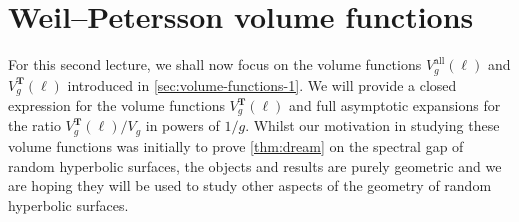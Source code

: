 \documentclass[12pt,twoside]{article}
\theoremstyle{theorem}
\newtheorem{prp}[thm]{Proposition}
\theoremstyle{remark}
\theoremstyle{definition}
\theoremstyle{example}
\newcommand{\R}{\mathbb{R}}
\renewcommand{\d}{\, \mathrm{d}}
\newcommand{\1}[1]{\mathds{1}_{#1}}
\newcommand{\cM}{\mathcal{M}}
\newcommand{\Volwp}[1][g]{\mathrm{Vol}_{#1}^{\mathrm{\scriptsize{WP}}}}
\newcommand{\Ewp}[2][g]{\mathbb{E}_{#1}^{\mathrm{\scriptsize{WP}}} \Bigg[ #2 \Bigg]}
\newcommand{\type}{\mathbf{T}}
\newcommand{\av}[2][\mathrm{all}]{\langle #2 \rangle_g^{{#1}}}
\begin{document}
\section{Weil--Petersson volume functions}
\label{sec:volume}

For this second lecture, we shall now focus on the volume functions $V_g^{\mathrm{all}}(\ell)$ and
$V_g^\type(\ell)$ introduced in \cref{sec:volume-functions-1}.
We will provide a closed expression for the volume functions $V_g^{\type}(\ell)$ and full asymptotic
expansions for the ratio $V_g^\type(\ell)/V_g$ in powers of $1/g$.  Whilst our motivation in
studying these volume functions was initially to prove \cref{thm:dream} on the spectral gap of random
hyperbolic surfaces, the objects and results are purely geometric and we are hoping they will be
used to study other aspects of the geometry of random hyperbolic surfaces.



\end{document}
